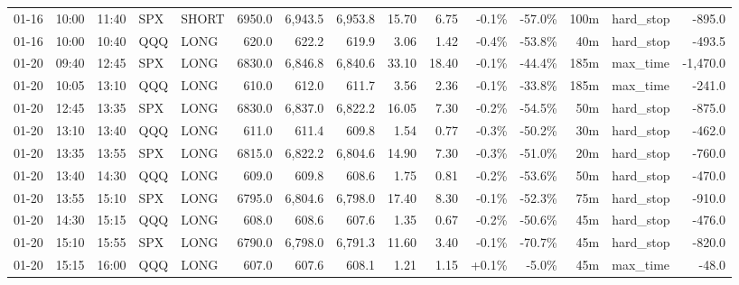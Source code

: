 \documentclass[11pt,a4paper,twoside]{article}
\begin{document}
\begin{landscape}
\begin{center}
\begin{longtable}{>{\color{txtmain}}l l l l l r r r r r r r r >{\color{txtmain}}l r}
01-16 & 10:00 & 11:40 & SPX & SHORT & 6950.0 & 6,943.5 & 6,953.8 & 15.70 & 6.75 & \textcolor{lossred}{-0.1\%} & \textcolor{lossred}{-57.0\%} & 100m & hard\_stop & \textcolor{lossred}{-895.0} \\
01-16 & 10:00 & 10:40 & QQQ & LONG & 620.0 & 622.2 & 619.9 & 3.06 & 1.42 & \textcolor{lossred}{-0.4\%} & \textcolor{lossred}{-53.8\%} & 40m & hard\_stop & \textcolor{lossred}{-493.5} \\
01-20 & 09:40 & 12:45 & SPX & LONG & 6830.0 & 6,846.8 & 6,840.6 & 33.10 & 18.40 & \textcolor{lossred}{-0.1\%} & \textcolor{lossred}{-44.4\%} & 185m & max\_time & \textcolor{lossred}{-1,470.0} \\
01-20 & 10:05 & 13:10 & QQQ & LONG & 610.0 & 612.0 & 611.7 & 3.56 & 2.36 & \textcolor{lossred}{-0.1\%} & \textcolor{lossred}{-33.8\%} & 185m & max\_time & \textcolor{lossred}{-241.0} \\
01-20 & 12:45 & 13:35 & SPX & LONG & 6830.0 & 6,837.0 & 6,822.2 & 16.05 & 7.30 & \textcolor{lossred}{-0.2\%} & \textcolor{lossred}{-54.5\%} & 50m & hard\_stop & \textcolor{lossred}{-875.0} \\
01-20 & 13:10 & 13:40 & QQQ & LONG & 611.0 & 611.4 & 609.8 & 1.54 & 0.77 & \textcolor{lossred}{-0.3\%} & \textcolor{lossred}{-50.2\%} & 30m & hard\_stop & \textcolor{lossred}{-462.0} \\
01-20 & 13:35 & 13:55 & SPX & LONG & 6815.0 & 6,822.2 & 6,804.6 & 14.90 & 7.30 & \textcolor{lossred}{-0.3\%} & \textcolor{lossred}{-51.0\%} & 20m & hard\_stop & \textcolor{lossred}{-760.0} \\
01-20 & 13:40 & 14:30 & QQQ & LONG & 609.0 & 609.8 & 608.6 & 1.75 & 0.81 & \textcolor{lossred}{-0.2\%} & \textcolor{lossred}{-53.6\%} & 50m & hard\_stop & \textcolor{lossred}{-470.0} \\
01-20 & 13:55 & 15:10 & SPX & LONG & 6795.0 & 6,804.6 & 6,798.0 & 17.40 & 8.30 & \textcolor{lossred}{-0.1\%} & \textcolor{lossred}{-52.3\%} & 75m & hard\_stop & \textcolor{lossred}{-910.0} \\
01-20 & 14:30 & 15:15 & QQQ & LONG & 608.0 & 608.6 & 607.6 & 1.35 & 0.67 & \textcolor{lossred}{-0.2\%} & \textcolor{lossred}{-50.6\%} & 45m & hard\_stop & \textcolor{lossred}{-476.0} \\
01-20 & 15:10 & 15:55 & SPX & LONG & 6790.0 & 6,798.0 & 6,791.3 & 11.60 & 3.40 & \textcolor{lossred}{-0.1\%} & \textcolor{lossred}{-70.7\%} & 45m & hard\_stop & \textcolor{lossred}{-820.0} \\
01-20 & 15:15 & 16:00 & QQQ & LONG & 607.0 & 607.6 & 608.1 & 1.21 & 1.15 & \textcolor{wingreen}{+0.1\%} & \textcolor{lossred}{-5.0\%} & 45m & max\_time & \textcolor{lossred}{-48.0} \\

\end{longtable}
\end{center}
\end{landscape}
\end{document}
